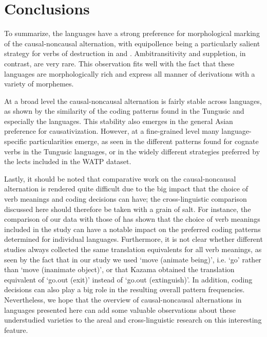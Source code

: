 \documentclass[output=paper,colorlinks,citecolor=brown]{langscibook}
\begin{document}
\section{Conclusions}\label{section2.7}

To summarize, the  languages have a strong preference for morphological marking of the causal-noncausal alternation, with equipollence being a particularly salient strategy for verbs of destruction in  and . Ambitransitivity and suppletion, in contrast, are very rare. This observation fits well with the fact that these languages are morphologically rich and express all manner of derivations with a variety of morphemes.

At a broad level the causal-noncausal alternation is fairly stable across languages, as shown by the similarity of the coding patterns found in the Tungusic and especially the  languages. This stability also emerges in the general Asian preference for causativization. However, at a fine-grained level many language-specific particularities emerge, as seen in the different patterns found for cognate verbs in the Tungusic languages, or in the widely different strategies preferred by the  lects included in the WATP dataset. 

Lastly, it should be noted that comparative work on the causal-noncausal alternation is rendered quite difficult due to the big impact that the choice of verb meanings and coding decisions can have; the cross-linguistic comparison discussed here should therefore be taken with a grain of salt. For instance, the comparison of our data with those of \citet{Nichols2018} has shown that the choice of verb meanings included in the study can have a notable impact on the preferred coding patterns determined for individual languages. Furthermore, it is not clear whether different studies always collected the same translation equivalents for all verb meanings, as seen by the fact that in our study we used ‘move (animate being)', i.e. `go’ rather than ‘move (inanimate object)’, or that Kazama obtained the translation equivalent of ‘go.out (exit)’ instead of ‘go.out (extinguish)’. In addition, coding decisions can also play a big role in the resulting overall pattern frequencies. Nevertheless, we hope that the overview of causal-noncausal alternations in  languages presented here can add some valuable observations about these understudied varieties to the areal and cross-linguistic research on this interesting feature.
\end{document}
